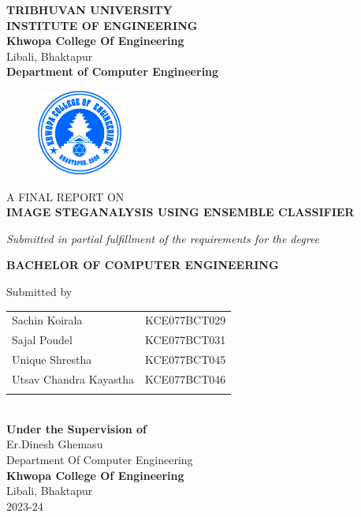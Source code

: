 	\begin{center}
		\thispagestyle{empty}
		\Large\textbf{TRIBHUVAN UNIVERSITY}\\
		\Large\textbf{INSTITUTE OF ENGINEERING }\\
		\vspace{0.2in}
		\large{\textbf{Khwopa College Of Engineering}\\}
		\normalsize{Libali, Bhaktapur\\}
		\large\textbf{Department of Computer Engineering}
		\vspace{0.2in}
		\begin{figure}[h]
		    \centering
			    \includegraphics[width=0.25\textwidth]{img/Khwopalogo.jpg}
		\end{figure}
		
		\vspace{0.2in}
		\large{A FINAL REPORT ON\\\textbf{IMAGE STEGANALYSIS USING ENSEMBLE CLASSIFIER}\\}
		
		\vspace{0.2in}
		\large{\textit{Submitted in partial fulfillment of the requirements for the degree\\}}
		
		\vspace{0.2in}
		\large{\textbf{BACHELOR OF COMPUTER ENGINEERING}\\}
		
		\vspace{0.2in}
		\large{Submitted by}\\
		\begin{tabular}{p{3.5in}p{3in}}
			\hspace{0.3cm}Sachin Koirala & KCE077BCT029\\
			\hspace{0.3cm}Sajal Poudel & KCE077BCT031\\
			\hspace{0.3cm}Unique Shrestha & KCE077BCT045\\
			\hspace{0.3cm}Utsav Chandra Kayastha &KCE077BCT046\\
		 \vspace{0.2in}
		\end{tabular}
		\\
		\vspace{1cm}
		\large{\textbf{Under the Supervision of}\\}
			\normalsize{Er.Dinesh Ghemasu\\
				Department Of Computer Engineering\\
			}
			\vspace{2cm}
		\large{\textbf{Khwopa College Of Engineering}\\}
			\normalsize{Libali, Bhaktapur\\
			2023-24
		}
	\end{center}
